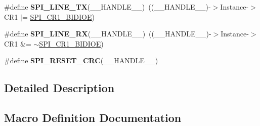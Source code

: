 \begin{DoxyCompactItemize}
\item 
\#define {\bfseries S\+P\+I\+\_\+L\+I\+N\+E\+\_\+\+TX}(\+\_\+\+\_\+\+H\+A\+N\+D\+L\+E\+\_\+\+\_\+)~((\+\_\+\+\_\+\+H\+A\+N\+D\+L\+E\+\_\+\+\_\+)-\/$>$Instance-\/$>$C\+R1 $\vert$= \hyperlink{group___peripheral___registers___bits___definition_ga378953916b7701bd49f063c0366b703f}{S\+P\+I\+\_\+\+C\+R1\+\_\+\+B\+I\+D\+I\+OE})\hypertarget{group___s_p_i___private___macros_gae3b2eb5e818e58b66474d42dedac5523}{}\label{group___s_p_i___private___macros_gae3b2eb5e818e58b66474d42dedac5523}

\item 
\#define {\bfseries S\+P\+I\+\_\+L\+I\+N\+E\+\_\+\+RX}(\+\_\+\+\_\+\+H\+A\+N\+D\+L\+E\+\_\+\+\_\+)~((\+\_\+\+\_\+\+H\+A\+N\+D\+L\+E\+\_\+\+\_\+)-\/$>$Instance-\/$>$C\+R1 \&= $\sim$\hyperlink{group___peripheral___registers___bits___definition_ga378953916b7701bd49f063c0366b703f}{S\+P\+I\+\_\+\+C\+R1\+\_\+\+B\+I\+D\+I\+OE})\hypertarget{group___s_p_i___private___macros_gaa8d58cef91c1874d5a4dde4014cf6269}{}\label{group___s_p_i___private___macros_gaa8d58cef91c1874d5a4dde4014cf6269}

\item 
\#define {\bfseries S\+P\+I\+\_\+\+R\+E\+S\+E\+T\+\_\+\+C\+RC}(\+\_\+\+\_\+\+H\+A\+N\+D\+L\+E\+\_\+\+\_\+)
\end{DoxyCompactItemize}


\subsection{Detailed Description}


\subsection{Macro Definition Documentation}

